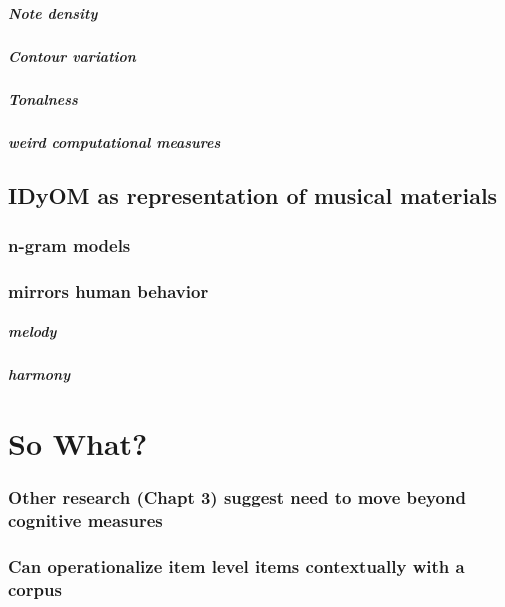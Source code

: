 \documentclass[]{book}
\let\oldsubparagraph\subparagraph
\renewcommand{\subparagraph}[1]{\oldsubparagraph{#1}\mbox{}}
\theoremstyle{definition}
\theoremstyle{definition}
\theoremstyle{definition}
\theoremstyle{remark}
\begin{document}
\hypertarget{note-density}{%
\subparagraph{Note density}\label{note-density}}

\hypertarget{contour-variation}{%
\subparagraph{Contour variation}\label{contour-variation}}

\hypertarget{tonalness}{%
\subparagraph{Tonalness}\label{tonalness}}

\hypertarget{weird-computational-measures}{%
\subparagraph{weird computational
measures}\label{weird-computational-measures}}

\hypertarget{idyom-as-representation-of-musical-materials}{%
\subsection{IDyOM as representation of musical
materials}\label{idyom-as-representation-of-musical-materials}}

\hypertarget{n-gram-models}{%
\subsubsection{n-gram models}\label{n-gram-models}}

\hypertarget{mirrors-human-behavior}{%
\subsubsection{mirrors human behavior}\label{mirrors-human-behavior}}

\hypertarget{melody}{%
\subparagraph{melody}\label{melody}}

\hypertarget{harmony}{%
\subparagraph{harmony}\label{harmony}}

\hypertarget{so-what}{%
\section{So What?}\label{so-what}}

\hypertarget{other-research-chapt-3-suggest-need-to-move-beyond-cognitive-measures}{%
\subsubsection{Other research (Chapt 3) suggest need to move beyond
cognitive
measures}\label{other-research-chapt-3-suggest-need-to-move-beyond-cognitive-measures}}

\hypertarget{can-operationalize-item-level-items-contextually-with-a-corpus}{%
\subsubsection{Can operationalize item level items contextually with a
corpus}\label{can-operationalize-item-level-items-contextually-with-a-corpus}}
\end{document}
